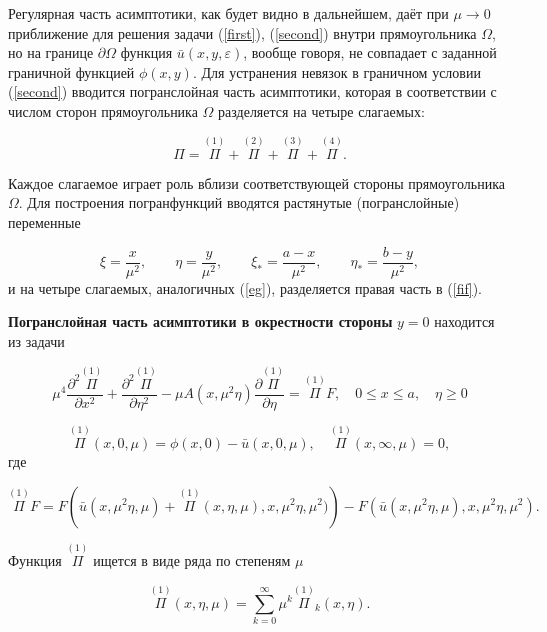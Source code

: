 \documentclass[12pt]{article}
\begin{document}
Регулярная часть асимптотики, как будет видно в дальнейшем, даёт при $\mu \to 0$ приближение для решения задачи (\ref{first}), (\ref{second}) внутри прямоугольника $\Omega$, но на границе $\partial \Omega$ функция $\bar u(x, y, \varepsilon)$, вообще говоря, не совпадает с заданной граничной функцией $\phi (x, y)$. Для устранения невязок в граничном условии (\ref{second}) вводится погранслойная часть асимптотики, которая в соответствии с числом сторон прямоугольника $\Omega$ разделяется на четыре слагаемых:

\begin{equation}\label{eg} \Pi = \overset{(1)}{\Pi} + \overset{(2)}{\Pi} + \overset{(3)}{\Pi} + \overset{(4)}{\Pi}.  \end{equation}

Каждое слагаемое играет роль вблизи соответствующей стороны прямоугольника $\Omega$. Для построения погранфункций вводятся растянутые (погранслойные) переменные

$$ \xi = \frac {x}{\mu^{2}}, \qquad \eta = \frac {y}{\mu^{2}}, \qquad \xi_{*} = \frac {a - x}{\mu^{2}}, \qquad \eta_{*} = \frac {b - y}{\mu^{2}}, $$
и на четыре слагаемых, аналогичных (\ref{eg}), разделяется правая часть в (\ref{fif}).

{\bf Погранслойная часть асимптотики в окрестности стороны} $y = 0$ находится из задачи

\begin{equation} \label{nine} \mu^{4} \frac {\partial^{2}  \overset{(1)}{\Pi}}{\partial x^{2}} + \frac {\partial^{2} \overset{(1)}{\Pi}}{\partial \eta^{2}} - \mu A(x, \mu^{2} \eta) \frac {\partial \overset{(1)}{\Pi}}{\partial \eta} = \overset{(1)}{\Pi}F, \quad  0 \leq x \leq a, \quad \eta \geq 0\end{equation}

\begin{equation} \label{ten} \overset{(1)}{\Pi}(x, 0, \mu) = \phi(x, 0) - \bar u (x, 0, \mu), \quad \overset{(1)}{\Pi}(x, \infty, \mu) = 0,  \end{equation}
где

$$ \overset{(1)}{\Pi} F = F \left (\bar u (x, \mu^{2} \eta, \mu) + \overset{(1)}{\Pi} (x, \eta, \mu),x,\mu^{2}\eta,\mu^{2})\right) - F(\bar u(x,\mu^{2}\eta, \mu),x,\mu^{2}\eta,\mu^{2}). $$

Функция $\overset{(1)}{\Pi}$ ищется в виде ряда по степеням $\mu$

\begin{equation} \label{ele} \overset{(1)}{\Pi} (x, \eta, \mu) = \sum_{k=0}^{\infty} \mu^{k}\overset{(1)}{\Pi}_{k} (x, \eta). \end{equation}
\end{document}
